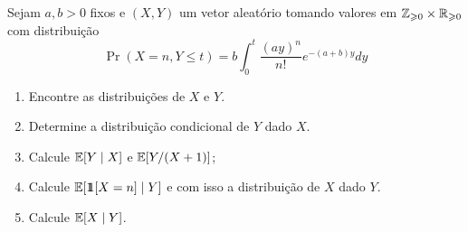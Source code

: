 \begin{exercise} [5]
	Sejam $a,b > 0$ fixos e $(X,Y)$ um vetor aleatório tomando valores
	em $\mathbb{Z}_{\geqslant 0} \times \mathbb{R}_{\geqslant 0}$ com distribuição
	\[
		\Pr(X = n, Y \leq t) = b \int_{0}^{t} \frac{(ay)^n}{n!}e^{-(a+b)y} dy
	\]
	\begin{enumerate}[label=(\alph*)]
		\item Encontre as distribuições de $X$ e $Y$.
		\item Determine a distribuição condicional de $Y$ dado $X$.
		\item Calcule $\mathbb{E}[Y \mid X]$ e $\mathbb{E}[Y/(X+1)]$;
		\item Calcule $\mathbb{E}[\hbox{$1\mkern-6.5mu1$}[X = n] \mid Y]$ e com isso a distribuição de
			$X$ dado $Y$.
		\item Calcule $\mathbb{E}[X \mid Y]$.
	\end{enumerate}
\end{exercise}

